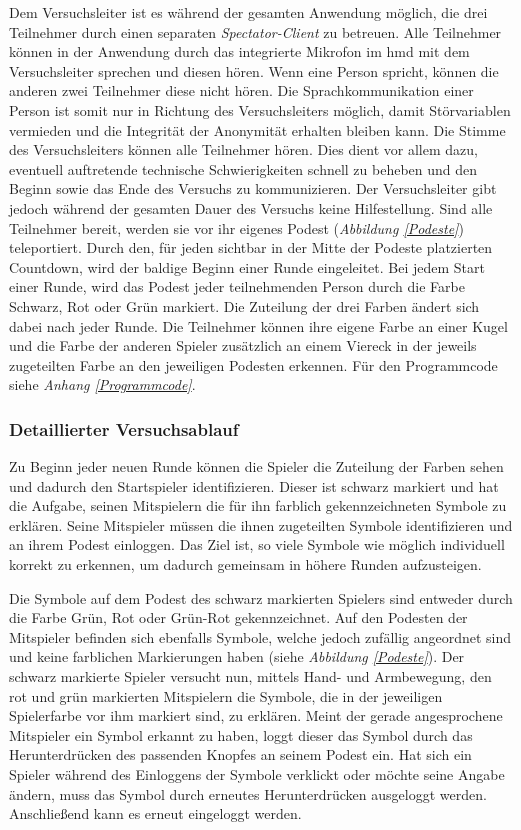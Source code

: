 \documentclass[a4paper,11pt]{article}%
\renewcommand{\\}{\vspace*{0.5\baselineskip} \newline}
\begin{document}
Dem Versuchsleiter ist es während der gesamten Anwendung möglich, die drei Teilnehmer durch einen separaten \textit{Spectator-Client} zu betreuen. Alle Teilnehmer können in der Anwendung durch das integrierte Mikrofon im \ac{hmd} mit dem Versuchsleiter sprechen und diesen hören. Wenn eine Person spricht, können die anderen zwei Teilnehmer diese nicht hören. Die Sprachkommunikation einer Person ist somit nur in Richtung des Versuchsleiters möglich, damit Störvariablen vermieden und die Integrität der Anonymität erhalten bleiben kann. Die Stimme des Versuchsleiters können alle Teilnehmer hören. Dies dient vor allem dazu, eventuell auftretende technische Schwierigkeiten schnell zu beheben und den Beginn sowie das Ende des Versuchs zu kommunizieren. Der Versuchsleiter gibt jedoch während der gesamten Dauer des Versuchs keine Hilfestellung.
Sind alle Teilnehmer bereit, werden sie vor ihr eigenes Podest (\textit{Abbildung \ref{Podeste}}) teleportiert. Durch den, für jeden sichtbar in der Mitte der Podeste platzierten Countdown, wird der baldige Beginn einer Runde eingeleitet. Bei jedem Start einer Runde, wird das Podest jeder teilnehmenden Person durch die Farbe Schwarz, Rot oder Grün markiert. Die Zuteilung der drei Farben ändert sich dabei nach jeder Runde. Die Teilnehmer können ihre eigene Farbe an einer Kugel und die Farbe der anderen Spieler zusätzlich an einem Viereck in der jeweils zugeteilten Farbe an den jeweiligen Podesten erkennen. Für den Programmcode siehe \textit{Anhang \ref{Programmcode}}.

	\subsubsection{Detaillierter Versuchsablauf}

Zu Beginn jeder neuen Runde können die Spieler die Zuteilung der Farben sehen und dadurch den Startspieler identifizieren. Dieser ist schwarz markiert und hat die Aufgabe, seinen Mitspielern die für ihn farblich gekennzeichneten Symbole zu erklären. Seine Mitspieler müssen die ihnen zugeteilten Symbole identifizieren und an ihrem Podest einloggen. Das Ziel ist, so viele Symbole wie möglich individuell korrekt zu erkennen, um dadurch gemeinsam in höhere Runden aufzusteigen.

Die Symbole auf dem Podest des schwarz markierten Spielers sind entweder durch die Farbe Grün, Rot oder Grün-Rot gekennzeichnet. Auf den Podesten der Mitspieler befinden sich ebenfalls Symbole, welche jedoch zufällig angeordnet sind und keine farblichen Markierungen haben (siehe \textit{Abbildung \ref{Podeste}}). Der schwarz markierte Spieler versucht nun, mittels Hand- und Armbewegung, den rot und grün markierten Mitspielern die Symbole, die in der jeweiligen Spielerfarbe vor ihm markiert sind, zu erklären. Meint der gerade angesprochene Mitspieler ein Symbol erkannt zu haben, loggt dieser das Symbol durch das Herunterdrücken des passenden Knopfes an seinem Podest ein. Hat sich ein Spieler während des Einloggens der Symbole verklickt oder möchte seine Angabe ändern, muss das Symbol durch erneutes Herunterdrücken ausgeloggt werden. Anschließend kann es erneut eingeloggt werden. 
\end{document}
